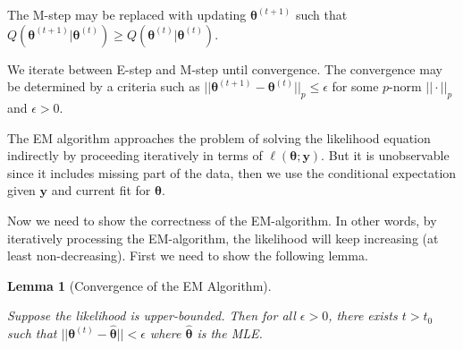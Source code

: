 \documentclass[
  a4paper,
  oneside,
  openany,
  12pt,
  onecolumn,
  twoside]{book}
\theoremstyle{plain}
\newtheorem{lemma}{Lemma}[chapter]
\theoremstyle{remark}
\begin{document}
The M-step may be replaced with updating \(\boldsymbol{\theta}^{(t+1)}\)
such that
\(Q(\boldsymbol{\theta}^{(t+1)}|\boldsymbol{\theta}^{(t)}) \geq Q(\boldsymbol{\theta}^{(t)}|\boldsymbol{\theta}^{(t)})\).

We iterate between E-step and M-step until convergence. The convergence
may be determined by a criteria such as
\(||\boldsymbol{\theta}^{(t+1)}-\boldsymbol{\theta}^{(t)}||_p\leq \epsilon\)
for some \(p\)-norm \(||\cdot||_p\) and \(\epsilon > 0\).

The EM algorithm approaches the problem of solving the likelihood
equation indirectly by proceeding iteratively in terms of
\(\ell(\boldsymbol{\theta};\boldsymbol{y})\). But it is unobservable
since it includes missing part of the data, then we use the conditional
expectation given \(\boldsymbol{y}\) and current fit for
\(\boldsymbol{\theta}\).

Now we need to show the correctness of the EM-algorithm. In other words,
by iteratively processing the EM-algorithm, the likelihood will keep
increasing (at least non-decreasing). First we need to show the
following lemma.

\begin{lemma}[Convergence of the EM
Algorithm]\protect\hypertarget{lem-convergence}{}\label{lem-convergence}

Suppose the likelihood is upper-bounded. Then for all \(\epsilon > 0\),
there exists \(t > t_0\) such that
\(||\boldsymbol{\theta}^{(t)} - \hat{\boldsymbol{\theta}}|| < \epsilon\)
where \(\hat{\boldsymbol{\theta}}\) is the MLE.

\end{lemma}
\end{document}
